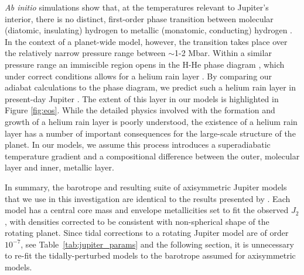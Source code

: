 \textit{Ab initio} simulations show that, at the temperatures relevant to Jupiter's
interior, there is no distinct, first-order phase transition between molecular
(diatomic, insulating) hydrogen to metallic (monatomic, conducting) hydrogen
\citep{vorberger2007}. In the context of a planet-wide model, however, the transition
takes place over the relatively narrow pressure range between $\sim$1-2 Mbar. Within
a similar pressure range an immiscible region opens in the H-He phase diagram
\cite{morales2013}, which under correct conditions allows for a helium rain layer
\cite{stevenson1977a,stevenson1977b}. By comparing our adiabat calculations to the
\cite{morales2013} phase diagram, we predict such a helium rain layer in present-day
Jupiter \citep{hubbard2016}. The extent of this layer in our models is highlighted in
Figure \ref{fig:eos}. While the detailed physics involved with the formation and
growth of a helium rain layer is poorly understood, the existence of a helium rain
layer has a number of important consequences for the large-scale structure of the
planet. In our models, we assume this process introduces a superadiabatic temperature
gradient and a compositional difference between the outer, molecular layer and inner,
metallic layer.

In summary, the barotrope and resulting suite of axisymmetric Jupiter models that we
use in this investigation are identical to the results presented by
\citet{hubbard2016}. Each model has a central core mass and envelope metallicities
set to fit the observed $J_2$ \citep{jacobson2003}, with densities corrected to be
consistent with non-spherical shape of the rotating planet. Since tidal corrections
to a rotating Jupiter model are of order $10^{-7}$, see
Table~\ref{tab:jupiter_params} and the following section, it is unnecessary to re-fit
the tidally-perturbed models to the barotrope assumed for axisymmetric models. 


